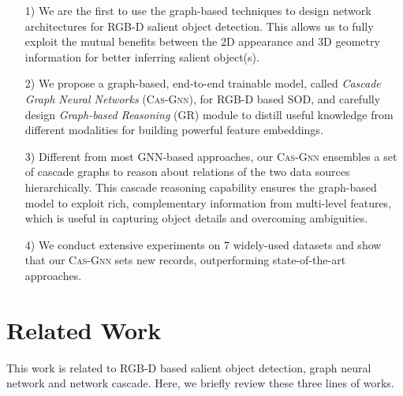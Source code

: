 \documentclass[runningheads]{llncs}
\begin{document}
\begin{enumerate}
	\item[1)] We are the first to use the graph-based techniques to design network architectures for RGB-D salient object detection. This allows us to fully exploit the mutual benefits between the 2D appearance and 3D geometry information for better inferring salient object(s). 
	
	


	\item[2)] We propose a graph-based, end-to-end trainable model, called {\em Cascade Graph Neural Networks} ({\scshape{Cas-Gnn}}), for RGB-D based SOD, and carefully design {\em Graph-based Reasoning} (GR) module to distill useful knowledge from different modalities for building powerful feature embeddings. 
	
	
	


	
	\item[3)] Different from most GNN-based approaches, our {\scshape{Cas-Gnn}} ensembles a set of cascade graphs to reason about relations of the two data sources hierarchically. This cascade reasoning capability ensures the graph-based model to exploit rich, complementary information from multi-level features, which is useful in capturing object details and overcoming ambiguities.
	
	
	\item[4)] We conduct extensive experiments on $7$ widely-used datasets and show that our {\scshape{Cas-Gnn}} sets new records, outperforming state-of-the-art approaches.  
	
	
\end{enumerate}	

	\section{Related Work}
		This work is related to RGB-D based salient object detection, graph neural network and network cascade. Here, we briefly review these three lines of works.
		
\end{document}
